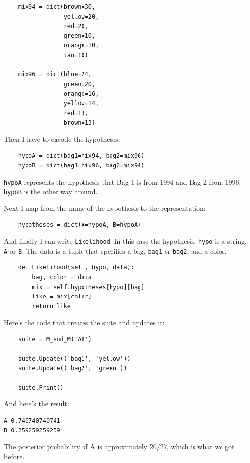 \documentclass[12pt]{book}
\begin{document}
\begin{verbatim}
    mix94 = dict(brown=30,
                 yellow=20,
                 red=20,
                 green=10,
                 orange=10,
                 tan=10)

    mix96 = dict(blue=24,
                 green=20,
                 orange=16,
                 yellow=14,
                 red=13,
                 brown=13)
\end{verbatim}

Then I have to encode the hypotheses:

\begin{verbatim}
    hypoA = dict(bag1=mix94, bag2=mix96)
    hypoB = dict(bag1=mix96, bag2=mix94)
\end{verbatim}

\verb"hypoA" represents the hypothesis that Bag 1 is from
1994 and Bag 2 from 1996.  \verb"hypoB" is the other way
around.

Next I map from the name of the hypothesis to the representation:

\begin{verbatim}
    hypotheses = dict(A=hypoA, B=hypoA)
\end{verbatim}

And finally I can write \verb"Likelihood".  In this case
the hypothesis, \verb"hypo" is a string, \verb"A" or \verb"B".
The data is a tuple that specifies a bag, \verb"bag1" or \verb"bag2",
and a color.

\begin{verbatim}
    def Likelihood(self, hypo, data):
        bag, color = data
        mix = self.hypotheses[hypo][bag]
        like = mix[color]
        return like
\end{verbatim}

Here's the code that creates the suite and updates it:

\begin{verbatim}
    suite = M_and_M('AB')

    suite.Update(('bag1', 'yellow'))
    suite.Update(('bag2', 'green'))

    suite.Print()
\end{verbatim}

And here's the result:

\begin{verbatim}
A 0.740740740741
B 0.259259259259
\end{verbatim}

The posterior probability of A is approximately $20/27$, which
is what we got before.
\end{document}
